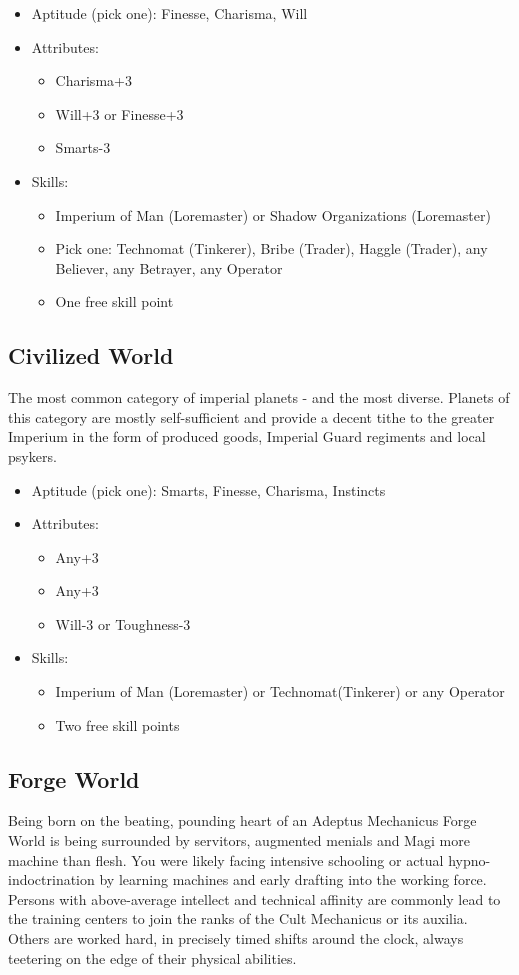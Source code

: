 \begin{itemize}
	\item Aptitude (pick one): Finesse, Charisma, Will
	\item Attributes:
	\begin{itemize}
		\item Charisma+3
		\item Will+3 or Finesse+3
		\item Smarts-3
	\end{itemize}
	\item Skills: 
	\begin{itemize}
	 	\item Imperium of Man (Loremaster) or Shadow Organizations (Loremaster)
	 	\item Pick one: Technomat (Tinkerer), Bribe (Trader), Haggle (Trader), any Believer, any Betrayer, any Operator
	 	\item One free skill point
	 \end{itemize} 
\end{itemize}


\subsection{Civilized World}
The most common category of imperial planets - and the most diverse. Planets of this category are mostly self-sufficient and provide a decent tithe to the greater Imperium in the form of produced goods, Imperial Guard regiments and local psykers.

\begin{itemize}
	\item Aptitude (pick one): Smarts, Finesse, Charisma, Instincts
	\item Attributes:
	\begin{itemize}
		\item Any+3
		\item Any+3
		\item Will-3 or Toughness-3
	\end{itemize}
	\item Skills: 
	\begin{itemize}
	 	\item Imperium of Man (Loremaster) or Technomat(Tinkerer) or any Operator
	 	\item Two free skill points
	 \end{itemize} 
\end{itemize}

\subsection{Forge World}
Being born on the beating, pounding heart of an Adeptus Mechanicus Forge World is being surrounded by servitors, augmented menials and Magi more machine than flesh. You were likely facing intensive schooling or actual hypno-indoctrination by learning machines and early drafting into the working force. Persons with above-average intellect and technical affinity are commonly lead to the training centers to join the ranks of the Cult Mechanicus or its auxilia. Others are worked hard, in precisely timed shifts around the clock, always teetering on the edge of their physical abilities.

